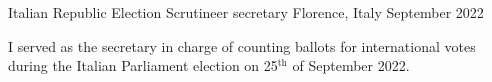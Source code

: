 \begin{cventries}
  \cventry
    {Italian Republic} %
    {Election Scrutineer secretary} %
    {Florence, Italy} %
    {September 2022} %
    {
      \begin{cvitems} %
        \item {I served as the secretary in charge of counting ballots for international votes during the Italian Parliament election on 25$^{\text{th}}$ of September 2022.}
      \end{cvitems}
    }
    \begin{comment}

  \cventry
    {School-Work Alternance} %
    {Italian School} %
    {Florence, Italy} %
    {June 2017 - June 2018} %
    {
      \begin{cvitems} %
        \item {\textbf{Observatory in Chianti:}} Design of an educational path summarizing the history of the universe. Tasks included brainstorming, selecting key eras, creating bilingual content (Italian and English), and designing panel supports. Skills acquired: deep understanding of the universe's history, firsthand observation of an astrophysicist’s work.
        \item {\textbf{University Hospital Company Meyer:}} Observation of pediatricians in the Rheumatology Department, assisting with patient visits and understanding the medical profession. Skills acquired: insights into the challenges of being a doctor, knowledge of rheumatology, including conditions like Lupus and Juvenile Idiopathic Arthritis (JIA).
        \item {\textbf{Caritas Florence:}} Creation of a file compiling the services offered by Caritas Firenze, mapping various locations in Florence and the positions of clothing recycling bins. Skills acquired: basic use of Photoshop and GIMP, understanding of the internal organization of the association.
      \end{cvitems}
    }
        
    \end{comment}
\end{cventries}
